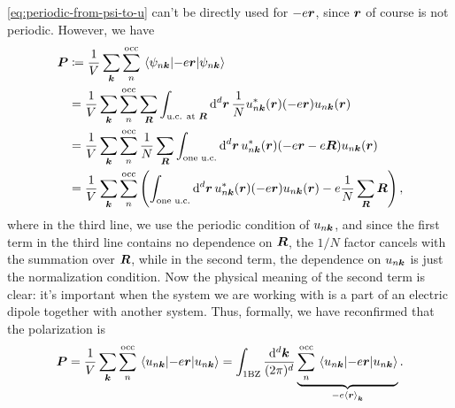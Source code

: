 \documentclass[hyperref, a4paper]{article}
\begin{document}
\eqref{eq:periodic-from-psi-to-u} can't be directly used for $- e \vb*{r}$,
since $\vb*{r}$ of course is not periodic.
However, we have 
\begin{equation}
    \begin{aligned}
        \vb*{P} &\coloneqq 
        \frac{1}{V} \sum_{\vb*{k}} \sum_{n}^{\text{occ}} \expval{- e \vb*{r}}{\psi_{n \vb*{k}}} \\
        &= \frac{1}{V} \sum_{\vb*{k}} \sum_{n}^{\text{occ}} 
        \sum_{\vb*{R}} \int_{\text{u.c. at $\vb*{R}$}}  \dd[d]{\vb*{r}}
        \frac{1}{N} u^*_{n \vb*{k}}(\vb*{r}) (- e \vb*{r}) u_{n \vb*{k}}(\vb*{r}) \\
        &= \frac{1}{V} \sum_{\vb*{k}} \sum_{n}^{\text{occ}}
        \frac{1}{N} \sum_{\vb*{R}} 
        \int_{\text{one u.c.}} \dd[d]{\vb*{r}} u^*_{n \vb*{k}}(\vb*{r})
        (- e \vb*{r} - e \vb*{R}) u_{n \vb*{k}}(\vb*{r}) \\
        &= \frac{1}{V} \sum_{\vb*{k}} \sum_{n}^{\text{occ}} 
        \left(\int_{\text{one u.c.}} \dd[d]{\vb*{r}} u^*_{n \vb*{k}}(\vb*{r}) (- e \vb*{r}) u_{n \vb*{k}}(\vb*{r})
        - e \frac{1}{N}\sum_{\vb*{R}} \vb*{R} \right),
    \end{aligned}
\end{equation}
where in the third line, 
we use the periodic condition of $u_{n \vb*{k}}$,
and since the first term in the third line contains no dependence on $\vb*{R}$,
the $1/N$ factor cancels with the summation over $\vb*{R}$,
while in the second term, 
the dependence on $u_{n \vb*{k}}$ is just the normalization condition.
Now the physical meaning of the second term is clear: 
it's important when the system we are working with 
is a part of an electric dipole 
together with another system.
Thus, formally, we have reconfirmed that the polarization is 
\begin{equation}
    \vb*{P} = \frac{1}{V} \sum_{\vb*{k}} \sum_{n}^{\text{occ}} \expval{- e \vb*{r}}{u_{n \vb*{k}}}
    = \int_{\text{1BZ}} \frac{\dd[d]{\vb*{k}}}{(2\pi)^d} 
    \underbrace{
        \sum_n^{\text{occ}}
        \expval{- e \vb*{r}}{u_{n \vb*{k}}}
    }_{- e \expval{\vb*{r}}_{\vb*{k}}} .
    \label{eq:polarization-naive-def}
\end{equation}
\end{document}
